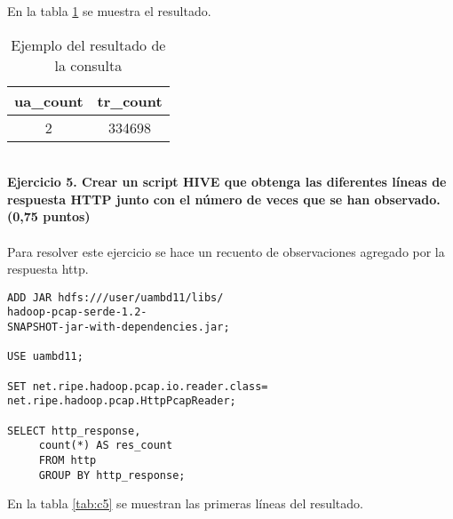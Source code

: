 En la tabla \ref{tab:c4} se muestra el resultado.\\
\begin{table}[ht]
	\centering
	\caption{Ejemplo del resultado de la consulta}
	\begin{tabular}[t]{cc}
		ua\_count & tr\_count \\
		\hline
		 2 &	334698
	\end{tabular}
	\label{tab:c4}
\end{table}%
\\
\textbf{Ejercicio 5. Crear un script HIVE que obtenga las diferentes líneas de respuesta HTTP junto con el número de veces que se han observado. (0,75 puntos)}\\\\
Para resolver este ejercicio se hace un recuento de observaciones agregado por la respuesta http.
\begin{lstlisting}[caption=Consulta para obtener el recuento de respuestas]
ADD JAR hdfs:///user/uambd11/libs/
hadoop-pcap-serde-1.2-
SNAPSHOT-jar-with-dependencies.jar;

USE uambd11;

SET net.ripe.hadoop.pcap.io.reader.class=
net.ripe.hadoop.pcap.HttpPcapReader;

SELECT http_response,
	 count(*) AS res_count
	 FROM http
	 GROUP BY http_response;
\end{lstlisting}
En la tabla \ref{tab:c5} se muestran las primeras líneas del resultado.

